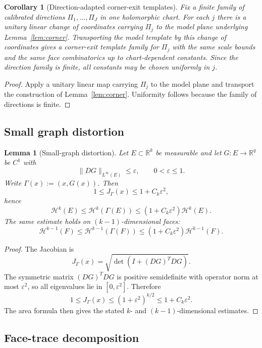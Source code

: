 \documentclass[11pt]{article}
\numberwithin{equation}{section}
\theoremstyle{plain}
\newtheorem{lemma}[theorem]{Lemma}
\newtheorem{corollary}[theorem]{Corollary}
\theoremstyle{definition}
\theoremstyle{remark}
\newcommand{\R}{\mathbb{R}}
\newcommand{\eps}{\varepsilon}
\newcommand{\calH}{\mathcal{H}}
\begin{document}
\begin{corollary}[Direction-adapted corner-exit templates]\label{cor:corner-adapted}
Fix a finite family of calibrated directions $\Pi_1,\dots,\Pi_J$ in one holomorphic chart.  For each $j$ there is a unitary linear change of coordinates carrying $\Pi_j$ to the model plane underlying Lemma~\ref{lem:corner}.  Transporting the model template by this change of coordinates gives a corner-exit template family for $\Pi_j$ with the same scale bounds and the same face combinatorics up to chart-dependent constants.  Since the direction family is finite, all constants may be chosen uniformly in $j$.
\end{corollary}

\begin{proof}
Apply a unitary linear map carrying $\Pi_j$ to the model plane and transport the construction of Lemma~\ref{lem:corner}.  Uniformity follows because the family of directions is finite.
\end{proof}

\subsection{Small graph distortion}

\begin{lemma}[Small-graph distortion]\label{lem:distortion}
Let $E\subset \R^k$ be measurable and let $G:E\to \R^q$ be $C^1$ with
\[
\|DG\|_{L^\infty(E)} \le \eps,
\qquad
0<\eps\le 1.
\]
Write $\Gamma(x):=(x,G(x))$.  Then
\[
1 \le J_\Gamma(x) \le 1 + C_k\eps^2,
\]
hence
\[
\calH^k(E)\le \calH^k(\Gamma(E)) \le (1+C_k\eps^2)\calH^k(E).
\]
The same estimate holds on $(k-1)$-dimensional faces:
\[
\calH^{k-1}(F)\le \calH^{k-1}(\Gamma(F)) \le (1+C_k\eps^2)\calH^{k-1}(F).
\]
\end{lemma}

\begin{proof}
The Jacobian is
\[
J_\Gamma(x)
=
\sqrt{\det(I+(DG)^TDG)}.
\]
The symmetric matrix $(DG)^TDG$ is positive semidefinite with operator norm at most $\eps^2$, so all eigenvalues lie in $[0,\eps^2]$.  Therefore
\[
1\le J_\Gamma(x)\le (1+\eps^2)^{k/2}\le 1 + C_k\eps^2.
\]
The area formula then gives the stated $k$- and $(k-1)$-dimensional estimates.
\end{proof}

\subsection{Face-trace decomposition}
\end{document}
